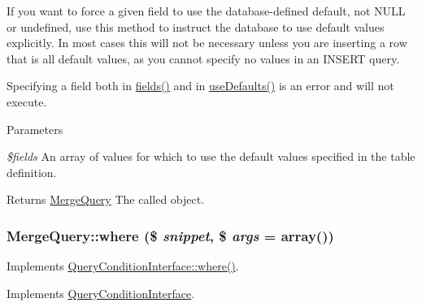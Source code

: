 If you want to force a given field to use the database-\/defined default, not NULL or undefined, use this method to instruct the database to use default values explicitly. In most cases this will not be necessary unless you are inserting a row that is all default values, as you cannot specify no values in an INSERT query.

Specifying a field both in \hyperlink{classMergeQuery_ae58f2865c72dfc4c310ec4c17fd4e72d}{fields()} and in \hyperlink{classMergeQuery_a630cdd152352b1229cc712ec261139cf}{useDefaults()} is an error and will not execute.


\begin{DoxyParams}{Parameters}
\item[{\em \$fields}]An array of values for which to use the default values specified in the table definition.\end{DoxyParams}
\begin{DoxyReturn}{Returns}
\hyperlink{classMergeQuery}{MergeQuery} The called object. 
\end{DoxyReturn}
\hypertarget{classMergeQuery_a1d46b2fc285ec9f402ac53800e3cd58f}{
\subsubsection[{where}]{\setlength{\rightskip}{0pt plus 5cm}MergeQuery::where (\$ {\em snippet}, \/  \$ {\em args} = {\ttfamily array()})}}
\label{classMergeQuery_a1d46b2fc285ec9f402ac53800e3cd58f}
Implements \hyperlink{interfaceQueryConditionInterface_a42c03c74dd81ef6d77041e67ec12e735}{QueryConditionInterface::where()}. 

Implements \hyperlink{interfaceQueryConditionInterface_a42c03c74dd81ef6d77041e67ec12e735}{QueryConditionInterface}.

